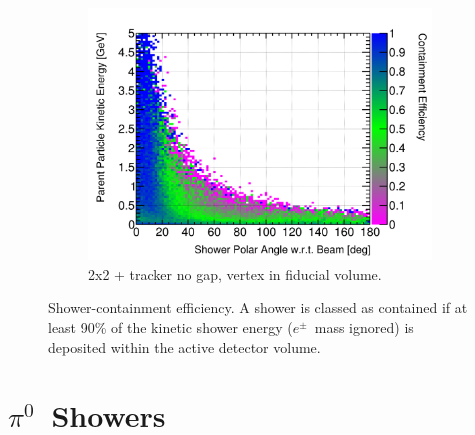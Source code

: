 \documentclass[10pt,a4paper,openany]{article}
\begin{document}
\begin{figure}[!htb]
\begin{subfigure}[b]{0.49\textwidth}
		\includegraphics[width=1.0\textwidth]{EM_cont_eff_2x2_Scintillator_fiducial.png}
		\caption{2x2 + tracker no gap, vertex in fiducial volume.}
		\label{}
	\end{subfigure}	
	\caption{Shower-containment efficiency. A shower is classed as contained if at least 90\% of the kinetic shower energy ($e^{\pm}$~mass ignored) is deposited within the active detector volume.}
\end{figure}

\clearpage
\section{$\pi^{0}$~Showers}
\end{document}
